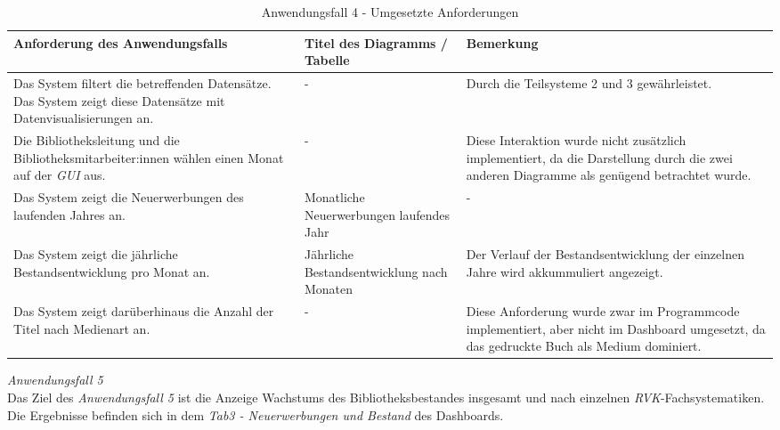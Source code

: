 \begingroup
    \setlength{\tabcolsep}{12pt} %
    \renewcommand{\arraystretch}{1.2} 
    \begin{table}[H]
        \centering
        \large
        \begin{adjustbox}{max width=\textwidth}
        \begin{tabular}{p{}p{}p{}}
           \toprule
           Anforderung des Anwendungsfalls        &Titel des Diagramms / Tabelle &Bemerkung\\
           \midrule
           Das System filtert die betreffenden Datensätze. Das System zeigt diese Datensätze mit Datenvisualisierungen an.&-&Durch die Teilsysteme 2  und 3 gewährleistet.\\
           Die Bibliotheksleitung und die Bibliotheksmitarbeiter:innen wählen einen Monat auf der \textit{\acrshort{GUI}} aus.&-&Diese Interaktion wurde nicht zusätzlich implementiert, da die Darstellung durch die zwei anderen Diagramme als genügend betrachtet wurde.\\
           Das System zeigt die Neuerwerbungen des laufenden Jahres an.&Monatliche Neuerwerbungen laufendes Jahr&-\\
           Das System zeigt die jährliche Bestandsentwicklung pro Monat an.&Jährliche Bestandsentwicklung nach Monaten&Der Verlauf der Bestandsentwicklung der einzelnen Jahre wird akkummuliert angezeigt.\\
           Das System zeigt darüberhinaus die Anzahl der Titel nach Medienart an.&-&Diese Anforderung wurde zwar im Programmcode implementiert, aber nicht im Dashboard umgesetzt, da das gedruckte Buch als Medium dominiert.\\

        \bottomrule
        \end{tabular}
        \end{adjustbox}
        \caption{%
            Anwendungsfall 4 - Umgesetzte Anforderungen
        }
        \label{tab:Anwendungsfall 4 - Umgesetzte Anforderungen}
        \end{table}
\endgroup

\clearpage
\noindent
\textit{Anwendungsfall 5}\\
Das Ziel des \textit{Anwendungsfall 5} ist die Anzeige Wachstums des Bibliotheksbestandes insgesamt und nach einzelnen \textit{\acrshort{RVK}}-Fachsystematiken.
Die Ergebnisse befinden sich in dem \textit{Tab3 - Neuerwerbungen und Bestand} des Dashboards.

